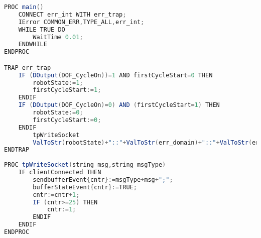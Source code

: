 \label{app:EventMessages}
\begin{lstlisting}[language=Java, caption=Task EventMessages - Modul 
EventMessages]
PROC main()
    CONNECT err_int WITH err_trap;
    IError COMMON_ERR,TYPE_ALL,err_int;
    WHILE TRUE DO
	    WaitTime 0.01;
    ENDWHILE
ENDPROC

TRAP err_trap
    IF (DOutput(DOF_CycleOn))=1 AND firstCycleStart=0 THEN
        robotState:=1;
        firstCycleStart:=1;
    ENDIF
    IF (DOutput(DOF_CycleOn)=0) AND (firstCycleStart=1) THEN
        robotState:=0;
        firstCycleStart:=0;
    ENDIF
		tpWriteSocket 
		ValToStr(robotState)+"::"+ValToStr(err_domain)+"::"+ValToStr(err_number)+"::"+ValToStr(err_type)+"::"+str1+"::"+"X"+"::"+"X"+"::"+"X"+"::"+"X",":e:";
ENDTRAP
	
PROC tpWriteSocket(string msg,string msgType)
	IF clientConnected THEN
		sendbufferEvent{cntr}:=msgType+msg+";";
		bufferStateEvent{cntr}:=TRUE;	
		cntr:=cntr+1;
		IF (cntr>=25) THEN
			cntr:=1;
		ENDIF
	ENDIF
ENDPROC
\end{lstlisting}
